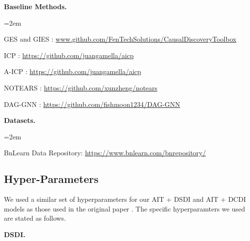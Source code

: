 \documentclass[nohyperref]{article}
\theoremstyle{plain}
\theoremstyle{definition}
\theoremstyle{remark}
\begin{document}
\textbf{Baseline Methods.}
\begin{list}{}{\leftmargin=2em}
    \item GES  \citep{chickering2002optimal} and GIES \citep{hauser2012characterization}: \url{www.github.com/FenTechSolutions/CausalDiscoveryToolbox} \citep{kalainathan2019causal}
    \item ICP \citep{peters2016causal}: \url{https://github.com/juangamella/aicp}
    \item A-ICP \citep{gamella2020active}: \url{https://github.com/juangamella/aicp}  
    \item NOTEARS  \citep{zheng2018dags}: \url{https://github.com/xunzheng/notears}
    \item DAG-GNN \citep{yu2019dag}:  \url{https://github.com/fishmoon1234/DAG-GNN}  
\end{list}

\textbf{Datasets.}
\begin{list}{}{\leftmargin=2em}
    \item BnLearn Data Repository: \url{https://www.bnlearn.com/bnrepository/} 
\end{list}


\clearpage
\subsection{Hyper-Parameters}
\label{sec:app_hyperparameters}
We used a similar set of hyperparameters for our AIT + DSDI and AIT + DCDI models as those used in the original paper \citep{ke2019learning,brouillard2020differentiable}. The specific hyperparamters we used are stated as follows. 

\textbf{DSDI.} \\
\end{document}

